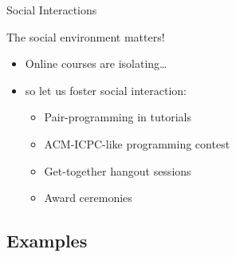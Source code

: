 \documentclass{beamer}
\begin{document}

\begin{frame}{Social Interactions}
\centerline{\Large{\alert{The social environment matters!}}}
\pause
\begin{itemize}[<+->]
\item Online courses are isolating\dots
\item[] so let us foster social interaction:
\begin{itemize}[<4->]
  \item Pair-programming in tutorials
  \item ACM-ICPC-like programming contest
  \item Get-together hangout sessions
  \item Award ceremonies
\end{itemize}
\end{itemize}
\end{frame}



\subsection{Examples}
\end{document}
